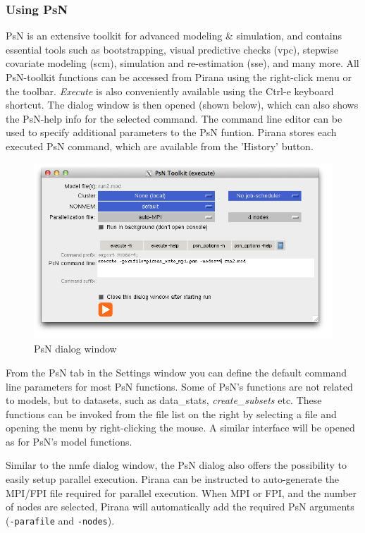 {{\clearpage

\subsubsection{Using PsN}
PsN is an extensive toolkit for advanced modeling \& simulation, and
contains essential tools such as bootstrapping, visual predictive
checks (vpc), stepwise covariate modeling (scm), simulation and
re-estimation (sse), and many more. All PsN-toolkit functions can be
accessed from Pirana using the right-click menu or the toolbar. \textit{Execute} is
also conveniently available using the Ctrl-e keyboard shortcut. The
dialog window is then opened (shown below), which can also shows the
PsN-help info for the selected command. The command line editor can be
used to specify additional parameters to the PsN funtion. Pirana
stores each executed PsN command, which are available from the
'History' button.

\begin{figure}[H] \centering
    \includegraphics[scale=0.42]{images/Figure2_4_PsNdialog2.png}
    \caption{PsN dialog window}
\end{figure}

\noindent From the PsN tab in the Settings window you can define the default
command line parameters for most PsN functions. Some of PsN's functions are not related to models, but to datasets, such as data\_stats, \textit{create\_subsets} etc. These functions can be invoked from the file list on the right by selecting a file and opening the menu by right-clicking the mouse. A similar interface will be opened
as for PsN's model functions.

Similar to the nmfe dialog window, the PsN dialog also offers the possibility to 
easily setup parallel execution. Pirana can be instructed to auto-generate
the MPI/FPI file required for parallel execution. When MPI or FPI, and the number of nodes are selected,
Pirana will automatically add the required PsN arguments ({\tt -parafile} and {\tt -nodes}).

}}
